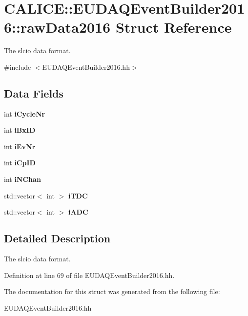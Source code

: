 \section{CALICE::EUDAQEventBuilder2016::rawData2016 Struct Reference}
\label{structCALICE_1_1EUDAQEventBuilder2016_1_1rawData2016}


The slcio data format.  


{\ttfamily \#include $<$EUDAQEventBuilder2016.hh$>$}\subsection*{Data Fields}
\begin{DoxyCompactItemize}
\item 
int {\bfseries iCycleNr}\label{structCALICE_1_1EUDAQEventBuilder2016_1_1rawData2016_a2a12b84f194650f0cb86bb5f15f87c50}

\item 
int {\bfseries iBxID}\label{structCALICE_1_1EUDAQEventBuilder2016_1_1rawData2016_a3ebe2cb51eabf615983343352119c26f}

\item 
int {\bfseries iEvNr}\label{structCALICE_1_1EUDAQEventBuilder2016_1_1rawData2016_a1722a96bd73d75a9f3ceb898e978025b}

\item 
int {\bfseries iCpID}\label{structCALICE_1_1EUDAQEventBuilder2016_1_1rawData2016_af178ec2c30a46ba3919c906861a62c94}

\item 
int {\bfseries iNChan}\label{structCALICE_1_1EUDAQEventBuilder2016_1_1rawData2016_ad405c2fa24fbb237cca29e60c3d00fe1}

\item 
std::vector$<$ int $>$ {\bfseries iTDC}\label{structCALICE_1_1EUDAQEventBuilder2016_1_1rawData2016_abf229e6f172b15bb1e52bbeef2c2fe48}

\item 
std::vector$<$ int $>$ {\bfseries iADC}\label{structCALICE_1_1EUDAQEventBuilder2016_1_1rawData2016_ae819b022d65475e10454ee71238dddba}

\end{DoxyCompactItemize}


\subsection{Detailed Description}
The slcio data format. 

Definition at line 69 of file EUDAQEventBuilder2016.hh.

The documentation for this struct was generated from the following file:\begin{DoxyCompactItemize}
\item 
EUDAQEventBuilder2016.hh\end{DoxyCompactItemize}
